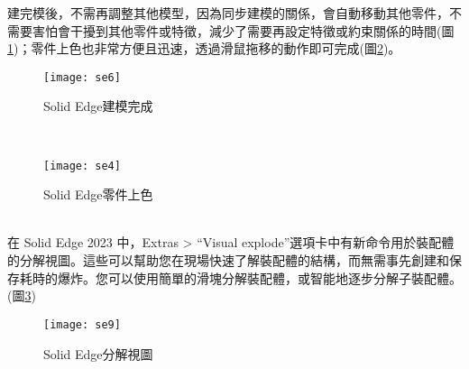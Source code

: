 建完模後，不需再調整其他模型，因為同步建模的關係，會自動移動其他零件，不需要害怕會干擾到其他零件或特徵，減少了需要再設定特徵或約束關係的時間(圖\ref{3.24})；零件上色也非常方便且迅速，透過滑鼠拖移的動作即可完成(圖\ref{3.25})。\\
\begin{figure}[hbt!]
\begin{center}
\texttt{[image: se6]}
\caption{\Large Solid Edge建模完成}\label{3.24}
\end{center}
\end{figure}
\\
\begin{figure}[hbt!]
\begin{center}
\texttt{[image: se4]}
\caption{\Large Solid Edge零件上色}\label{3.25}
\end{center}
\end{figure}
\\

在 Solid Edge 2023 中，Extras > “Visual explode”選項卡中有新命令用於裝配體的分解視圖。這些可以幫助您在現場快速了解裝配體的結構，而無需事先創建和保存耗時的爆炸。您可以使用簡單的滑塊分解裝配體，或智能地逐步分解子裝配體。(圖\ref{3.26})\\
\begin{figure}[hbt!]
\begin{center}
\texttt{[image: se9]}
\caption{\Large Solid Edge分解視圖}\label{3.26}
\end{center}
\end{figure}
\\

\newpage



